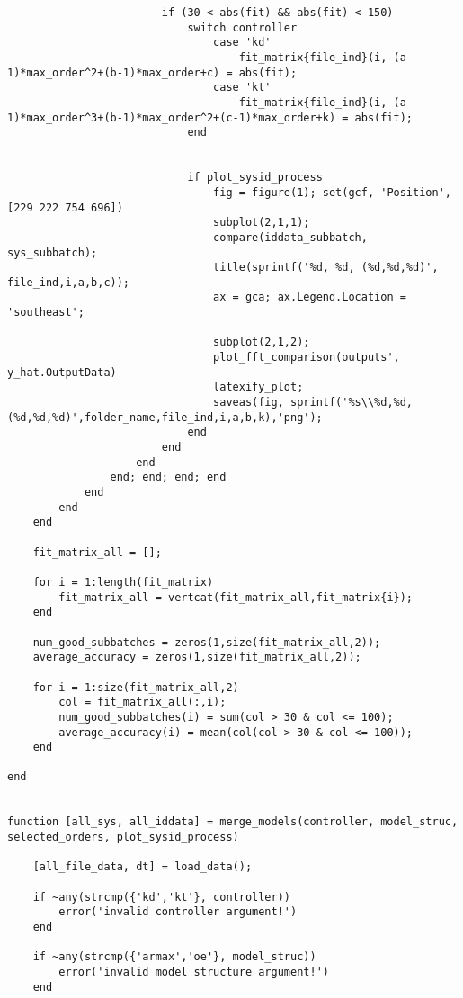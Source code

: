 \begin{lstlisting}
                        if (30 < abs(fit) && abs(fit) < 150)
                            switch controller
                                case 'kd'
                                    fit_matrix{file_ind}(i, (a-1)*max_order^2+(b-1)*max_order+c) = abs(fit);
                                case 'kt'
                                    fit_matrix{file_ind}(i, (a-1)*max_order^3+(b-1)*max_order^2+(c-1)*max_order+k) = abs(fit);
                            end
    
    
                            if plot_sysid_process
                                fig = figure(1); set(gcf, 'Position', [229 222 754 696])
                                subplot(2,1,1);
                                compare(iddata_subbatch, sys_subbatch);
                                title(sprintf('%d, %d, (%d,%d,%d)', file_ind,i,a,b,c));
                                ax = gca; ax.Legend.Location = 'southeast';
    
                                subplot(2,1,2);
                                plot_fft_comparison(outputs', y_hat.OutputData)
                                latexify_plot;
                                saveas(fig, sprintf('%s\\%d,%d,(%d,%d,%d)',folder_name,file_ind,i,a,b,k),'png');
                            end
                        end
                    end
                end; end; end; end
            end
        end
    end
    
    fit_matrix_all = [];
    
    for i = 1:length(fit_matrix)
        fit_matrix_all = vertcat(fit_matrix_all,fit_matrix{i});
    end
    
    num_good_subbatches = zeros(1,size(fit_matrix_all,2));
    average_accuracy = zeros(1,size(fit_matrix_all,2));
    
    for i = 1:size(fit_matrix_all,2)
        col = fit_matrix_all(:,i);
        num_good_subbatches(i) = sum(col > 30 & col <= 100);
        average_accuracy(i) = mean(col(col > 30 & col <= 100));
    end

end


function [all_sys, all_iddata] = merge_models(controller, model_struc, selected_orders, plot_sysid_process)

    [all_file_data, dt] = load_data();
    
    if ~any(strcmp({'kd','kt'}, controller))
        error('invalid controller argument!')
    end
    
    if ~any(strcmp({'armax','oe'}, model_struc))
        error('invalid model structure argument!')
    end
    

\end{lstlisting}
